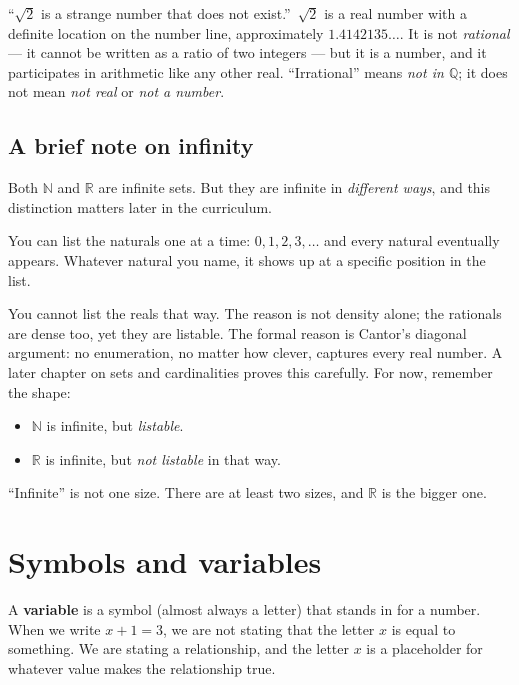 \begin{mistake}
``$\sqrt{2}$ is a strange number that does not exist.''\ $\sqrt{2}$ is a real number with a definite location on the number line, approximately $1.4142135\ldots$. It is not \emph{rational} — it cannot be written as a ratio of two integers — but it is a number, and it participates in arithmetic like any other real. ``Irrational'' means \textit{not in $\mathbb{Q}$}; it does not mean \textit{not real} or \textit{not a number}.
\end{mistake}

\subsection*{A brief note on infinity}

Both $\mathbb{N}$ and $\mathbb{R}$ are infinite sets. But they are infinite in \emph{different ways}, and this distinction matters later in the curriculum.

You can list the naturals one at a time: $0, 1, 2, 3, \ldots$ and every natural eventually appears. Whatever natural you name, it shows up at a specific position in the list.

You cannot list the reals that way. The reason is not density alone; the rationals are dense too, yet they are listable. The formal reason is Cantor's diagonal argument: no enumeration, no matter how clever, captures every real number. A later chapter on sets and cardinalities proves this carefully. For now, remember the shape:
\begin{itemize}
  \item $\mathbb{N}$ is infinite, but \emph{listable}.
  \item $\mathbb{R}$ is infinite, but \emph{not listable} in that way.
\end{itemize}
``Infinite'' is not one size. There are at least two sizes, and $\mathbb{R}$ is the bigger one.


\section{Symbols and variables}

A \textbf{variable} is a symbol (almost always a letter) that stands in for a number. When we write $x + 1 = 3$, we are not stating that the letter $x$ is equal to something. We are stating a relationship, and the letter $x$ is a placeholder for whatever value makes the relationship true.

